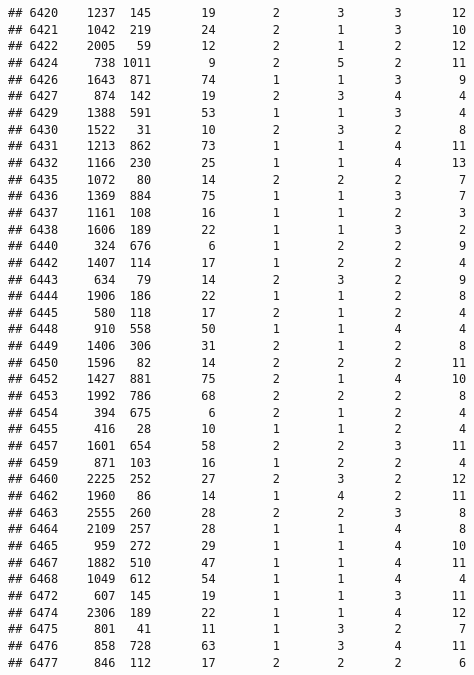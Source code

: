 \documentclass[]{article}
\begin{document}
\begin{verbatim}
## 6420    1237  145       19        2        3       3       12
## 6421    1042  219       24        2        1       3       10
## 6422    2005   59       12        2        1       2       12
## 6424     738 1011        9        2        5       2       11
## 6426    1643  871       74        1        1       3        9
## 6427     874  142       19        2        3       4        4
## 6429    1388  591       53        1        1       3        4
## 6430    1522   31       10        2        3       2        8
## 6431    1213  862       73        1        1       4       11
## 6432    1166  230       25        1        1       4       13
## 6435    1072   80       14        2        2       2        7
## 6436    1369  884       75        1        1       3        7
## 6437    1161  108       16        1        1       2        3
## 6438    1606  189       22        1        1       3        2
## 6440     324  676        6        1        2       2        9
## 6442    1407  114       17        1        2       2        4
## 6443     634   79       14        2        3       2        9
## 6444    1906  186       22        1        1       2        8
## 6445     580  118       17        2        1       2        4
## 6448     910  558       50        1        1       4        4
## 6449    1406  306       31        2        1       2        8
## 6450    1596   82       14        2        2       2       11
## 6452    1427  881       75        2        1       4       10
## 6453    1992  786       68        2        2       2        8
## 6454     394  675        6        2        1       2        4
## 6455     416   28       10        1        1       2        4
## 6457    1601  654       58        2        2       3       11
## 6459     871  103       16        1        2       2        4
## 6460    2225  252       27        2        3       2       12
## 6462    1960   86       14        1        4       2       11
## 6463    2555  260       28        2        2       3        8
## 6464    2109  257       28        1        1       4        8
## 6465     959  272       29        1        1       4       10
## 6467    1882  510       47        1        1       4       11
## 6468    1049  612       54        1        1       4        4
## 6472     607  145       19        1        1       3       11
## 6474    2306  189       22        1        1       4       12
## 6475     801   41       11        1        3       2        7
## 6476     858  728       63        1        3       4       11
## 6477     846  112       17        2        2       2        6

\end{verbatim}
\end{document}
